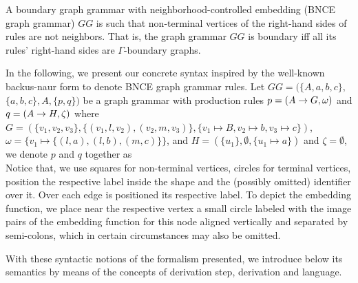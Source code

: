 \documentclass[]{report}
\begin{document}
\begin{definition}
	A boundary graph grammar with neighborhood-controlled embedding (BNCE graph grammar) $GG$ is such that non-terminal vertices of the right-hand sides of rules are not neighbors. That is, the graph grammar $GG$ is boundary iff all its rules' right-hand sides are $\Gamma\text{-boundary}$ graphs.
\end{definition}


In the following, we present our concrete syntax inspired by the well-known backus-naur form to denote BNCE graph grammar rules. Let $GG = (\{A,a,b,c\},$ $\{a,b,c\}, A, \{p,q\})$ be a graph grammar with production rules $p = (A \to G,\omega)$ and $q = (A \to H,\zeta)$ where $G = (\{v_1, v_2, v_3\}, \{(v_1,l,v_2), (v_2,m,v_3)\}, \{v_1 \mapsto B, v_2 \mapsto b, v_3 \mapsto c \})$, $\omega = \{v_1 \mapsto \{(l,a), (l,b), (m,c)\}\}$, and $H = (\{u_1\}, \emptyset, \{u_1 \mapsto a\})$ and $\zeta = \emptyset$, we denote $p$ and $q$ together as\\


Notice that, we use squares for non-terminal vertices, circles for terminal vertices, position the respective label inside the shape and the (possibly omitted) identifier over it. Over each edge is positioned its respective label. To depict the embedding function, we place near the respective vertex a small circle labeled with the image pairs of the embedding function for this node aligned vertically and separated by semi-colons, which in certain circumstances may also be omitted.


With these syntactic notions of the formalism presented, we introduce below its semantics by means of the concepts of derivation step, derivation and language.
\end{document}
